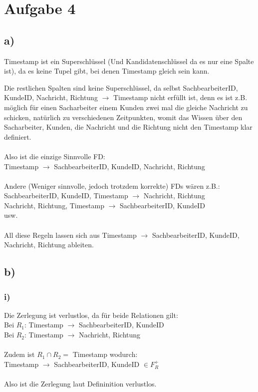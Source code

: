 \pagebreak
\section*{Aufgabe 4}
\subsection*{a)}
Timestamp ist ein Superschlüssel (Und Kandidatenschlüssel da es nur eine Spalte ist), da es keine Tupel gibt, bei denen Timestamp gleich sein kann. 

Die restlichen Spalten sind keine Superschlüssel, da selbst SachbearbeiterID, KundeID, Nachricht, Richtung $ \rightarrow  $ Timestamp nicht erfüllt ist, denn es ist z.B. möglich für einen Sacharbeiter einem Kunden zwei mal die gleiche Nachricht zu schicken, natürlich zu verschiedenen Zeitpunkten, womit das Wissen über den Sacharbeiter, Kunden, die Nachricht und die Richtung nicht den Timestamp klar definiert. \\\\
Also ist die einzige Sinnvolle FD: \\
Timestamp $ \rightarrow  $ SachbearbeiterID, KundeID, Nachricht, Richtung \\\\
Andere (Weniger sinnvolle, jedoch trotzdem korrekte) FDs wären z.B.: \\
SachbearbeiterID, KundeID, Timestamp $ \rightarrow  $ Nachricht, Richtung \\
Nachricht, Richtung, Timestamp $ \rightarrow  $ SachbearbeiterID, KundeID \\
usw. \\\\
All diese Regeln lassen sich aus Timestamp $ \rightarrow  $ SachbearbeiterID, KundeID, Nachricht, Richtung ableiten.
\subsection*{b)}
\subsubsection*{i)}
Die Zerlegung ist verlustlos, da für beide Relationen gilt: \\
Bei $ R_1 $: Timestamp $ \rightarrow  $ SachbearbeiterID, KundeID \\
Bei $ R_2 $: Timestamp $ \rightarrow  $ Nachricht, Richtung \\\\
Zudem ist $ R_1 \cap R_2 = $ Timestamp  wodurch: \\
Timestamp $ \rightarrow  $ SachbearbeiterID, KundeID $ \in F^+_R $ \\\\
Also ist die Zerlegung laut Defininition verlustlos.
